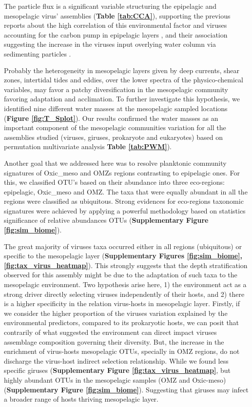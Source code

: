 \documentclass[fleqn,10pt]{wlscirep}
\begin{document}
The particle flux is a significant variable structuring the epipelagic and mesopelagic virus’ assemblies (\textbf{Table \ref{tab:CCA}}), supporting the previous reports about the high correlation of this environmental factor and viruses accounting for the carbon pump in epipelagic layers \cite{guidi_plankton_2016}, and their association suggesting the increase in the viruses input overlying water column via sedimenting particles \cite{parada_viral_2007}.

Probably the heterogeneity in mesopelagic layers given by deep currents, shear zones, intertidal tides and eddies, over the lower spectra of the physico-chemical variables, may favor a patchy diversification in the mesopelagic community favoring adaptation and acclimation. To further investigate this hypothesis, we identified nine different water masses at the mesopelagic sampled locations (\textbf{Figure \ref{fig:T_Splot}}). Our results confirmed the water masses as an important component of the mesopelagic communities variation for all the assemblies studied (viruses, giruses, prokaryote and eukaryotes) based on permutation multivariate analysis \textbf{Table \ref{tab:PWM}}).

Another goal that we addressed here was to resolve planktonic community signatures of Oxic\_meso and OMZs regions contrasting to epipelagic ones. For this, we classified OTU’s based on their abundance into three eco-regions: epipelagic, Oxic\_meso and OMZ. The taxa that were equally abundant in all the regions were classified as ubiquitous. Strong evidences for eco-regions taxonomic signatures were achieved by applying a powerful methodology based on statistics significance of relative abundances OTUs (\textbf{Supplementary Figure \ref{fig:sim_biome}}).

The great majority of viruses taxa occurred either in all regions (ubiquitous) or specific to the mesopelagic layer (\textbf{Supplementary Figures \ref{fig:sim_biome}, \ref{fig:tax_virus_heatmap}}). This strongly suggests that the depth stratification observed for this assembly might be due to the adaptation of such taxa to the mesopelagic environment. Two hypothesis arise here, 1) the environment act as a strong driver directly selecting viruses independently of their hosts, and 2) there is a higher specificity in the relation virus-hosts in mesopelagic layer. Firstly, if we consider the higher proportion of the viruses variation explained by the environmental predictors, compared to its prokaryotic hosts, we can posit that contrarily of what suggested the environment can direct impact viruses assemblage composition governing their diversity. But, the increase in the  enrichment of virus-hosts mesopelagic OTUs, specially in OMZ regions, do not discharge the virus-host indirect selection relationship.
While we found less specific giruses (\textbf{Supplementary Figure \ref{fig:tax_virus_heatmap}}, but highly abundant OTUs in the mesopelagic samples (OMZ and Oxic-meso) (\textbf{Supplementary Figure \ref{fig:sim_biome}}). Suggesting that giruses may infect a broader range of hosts thriving mesopelagic layer.
\end{document}
